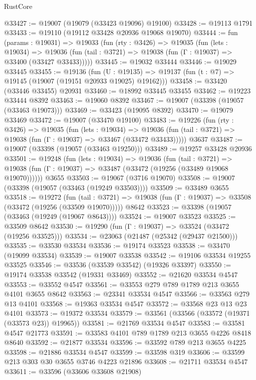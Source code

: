 \begin{lexlean}{RustCore}
\begin{coremodule}
@33427 := @19007 (@19079 (@33423 @19096) @19100)
@33428 := @19113 @1791
@33433 := @19110 (@19112 @33428 @20936 @19068 @19070)
@33444 := fun (params : @19031) =>
  @19033
    (fun (rty : @3426) =>
    @19035
      (fun (lets : @19034) =>
      @19036 (fun (tail : @3721) => @19038 (fun (Γ : @19037) => @33400 (@33427 @33433)))))
@33445 := @19032 @33444
@33446 := @19029 @33445
@33455 := @19136
    (fun (U : @19135) => @19137 (fun (t : @7) => @19145 (@19007 (@19151 @20933 @19025) @19162)))
@33458 := @33420 (@33446 @33455) @20931
@33460 := @18992 @33445 @33455
@33462 := @19223 @33444 @8392
@33463 := @19060 @8392
@33467 := @19007 (@33398 (@19057 (@33463 @19073)))
@33469 := @33423 (@19095 @8392)
@33470 := @19079 @33469
@33472 := @19007 (@33470 @19100)
@33483 := @19226
    (fun (rty : @3426) =>
    @19035
      (fun (lets : @19034) =>
      @19036 (fun (tail : @3721) => @19038 (fun (Γ : @19037) => @33467 (@33472 @33433)))))
    @3637
@33487 := @19007 (@33398 (@19057 (@33463 @19250)))
@33489 := @19257 @33428 @20936
@33501 := @19248
    (fun (lets : @19034) =>
    @19036
      (fun (tail : @3721) =>
      @19038 (fun (Γ : @19037) => @33487 (@33472 (@19256 (@33489 @19068 @19070))))))
    @3655
@33503 := @19067 (@3716 @19070)
@33508 := @19007 (@33398 (@19057 (@33463 (@19249 @33503))))
@33509 := @33489 @3655
@33518 := @19272
    (fun (tail : @3721) => @19038 (fun (Γ : @19037) => @33508 (@33472 (@19256 (@33509 @19070)))))
    @8642
@33523 := @33398 (@19057 (@33463 (@19249 (@19067 @8643))))
@33524 := @19007 @33523
@33525 := @33509 @8642
@33530 := @19290 (fun (Γ : @19037) => @33524 (@33472 (@19256 @33525)))
@33534 := @23063 (@21487 (@25342 (@29437 @21500)))
@33535 := @33530 @33534
@33536 := @19174 @33523
@33538 := @33470 (@19099 @33534)
@33539 := @19007 @33538
@33542 := @19106 @33534 @19255 @33525
@33546 := @33536 (@33539 @33542) (@19326 @33397)
@33550 := @19174 @33538 @33542 (@19331 @33469)
@33552 := @21620 @33534 @4547
@33553 := @33552 @4547
@33561 := @33553 @279 @789 @1789 @213 @3655 @4101 @3655 @8642
@33563 := @23341 @33534 @4547
@33566 := @33563 @279 @13 @4101
@33568 := @19363 @33534 @4547
@33572 := @33568 @23 @13 @23 @4101
@33573 := @19372 @33534
@33579 := @33561 (@33566 (@33572 (@19371 (@33573 @23)) @19965))
@33581 := @21769 @33534 @4547
@33583 := @33581 @4547 @21773
@33591 := @33583 @4101 @789 @1789 @213 @3655 @4226 @8418 @8640
@33592 := @21877 @33534
@33596 := @33592 @789 @213 @3655 @4225
@33598 := @21886 @33534 @4547
@33599 := @33598 @319
@33606 := @33599 @213 @303 @30 @3655 @3746 @4223 @21896
@33608 := @21711 @33534 @4547
@33611 := @33596 (@33606 @33608 @21908)

\end{coremodule}
\end{lexlean}

